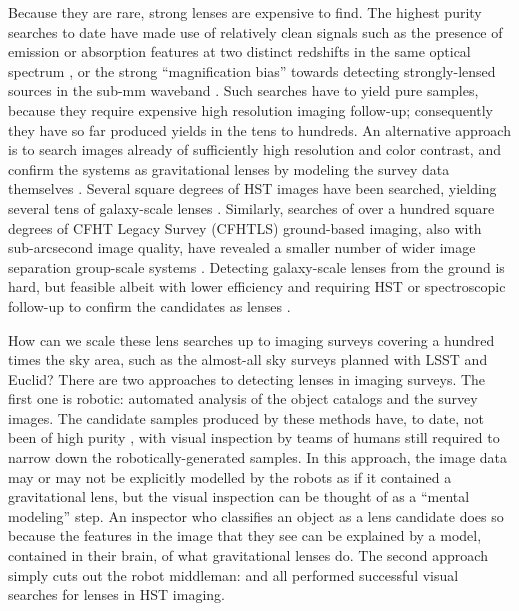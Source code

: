 \documentclass[useAMS,usenatbib,a4paper]{mn2e}
\begin{document}
Because they are rare, strong lenses are expensive to find. The highest purity
searches to date have made use of relatively clean signals such as the
presence of emission or absorption features at two distinct redshifts in the
same optical spectrum \citep[e.g.][]{BoltonEtal2004}, or the strong
``magnification bias'' towards detecting strongly-lensed sources in the sub-mm
waveband \citep[e.g.][]{NegrelloEtal2010}. Such searches have to yield pure samples,
because they require expensive high resolution imaging follow-up; consequently
they have so far produced yields in the tens to hundreds. An alternative
approach is to search images already of sufficiently high resolution and color
contrast, and confirm the systems as gravitational lenses by modeling the
survey data themselves \citep[][]{MarshallEtal2009}. Several square degrees of
HST images have been searched, yielding several tens of galaxy-scale lenses
\citep[e.g.][]{MoustakasEtal2007,FaureEtal2008,Jackson2008,MoreEtal2011,
PawaseEtal2014}. Similarly, searches of over a hundred square degrees of CFHT
Legacy Survey (CFHTLS) ground-based imaging, also with sub-arcsecond image quality,
have revealed a smaller number of wider image separation group-scale systems
\citep[e.g.][]{CabanacEtal2007,MoreEtal2012}. Detecting galaxy-scale lenses
from the ground is hard, but feasible albeit with lower efficiency and requiring
HST or spectroscopic follow-up to confirm the candidates as lenses
\citep[e.g.][]{GavazziEtal2014}.


How can we scale these lens searches up to imaging surveys covering a hundred
times the sky area, such as the almost-all sky surveys planned with LSST and
Euclid?  There are two approaches to detecting lenses in imaging surveys. The
first one is robotic: automated analysis of the object catalogs and the survey
images. The candidate samples produced by these methods have, to date, not been
of high purity  \citep[see
e.g.][]{MarshallEtal2009,MoreEtal2012,GavazziEtal2014}, with visual inspection
by teams of humans still required to narrow down the robotically-generated
samples. In this approach, the image data may or may not be explicitly modelled
by the robots as if it contained a gravitational lens, but the visual inspection
can be thought of as a ``mental modeling'' step.  An inspector who classifies an
object as a lens candidate does so because the features in the image that they
see can be explained by a model, contained in their brain, of what gravitational
lenses do.  The second approach simply cuts out the robot middleman:
\citet{MoustakasEtal2007,FaureEtal2008,Jackson2008} and \citet{PawaseEtal2014}
all performed successful visual searches for lenses in HST imaging.
\end{document}
